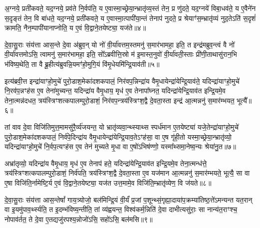 अ॒ग्नये॒ प्रती॑कवते॒ यद॒ग्नये॒ प्रव॑ते नि॒र्वप॑ति॒ य ए॒वास्मा॒च्छ्रेया॒न्भ्रातृ॑व्य॒स्तं तेन॒ प्र णु॑दते॒ यद॒ग्नये॑ विबा॒धव॑ते॒ य ए॒वैने॑न स॒दृङ्तं तेन॒ वि बा॑धते॒ यद॒ग्नये॒ प्रती॑कवते॒ य ए॒वास्मा॒त्पापी॑या॒न्तं तेनाप॑ नुदते॒ प्र श्रेयाꣳ॑स॒म्भ्रातृ॑व्यं नुद॒ते\-ऽति॑ स॒दृशं॑ क्रामति॒ नैन॒म्पापी॑यानाप्नोति॒ य ए॒वं वि॒द्वाने॒तयेष्ट्या॒ यज॑ते॥४॥

{\anuvakamend[{वृ॒णा॒म॒है॒ यत्पु॒रस्ता॒द्रक्षाꣳ॑सि वपेद॒ग्नये॑ विबा॒धव॑त ए॒वं च॒त्वारि॑ च॥१॥}]}

दे॒वा॒सु॒राः संय॑त्ता आस॒न्ते दे॒वा अ॑ब्रुव॒न् यो नो॑ वी॒र्या॑वत्तम॒स्तमनु॑ स॒मार॑भामहा॒ इति॒ त इन्द्र॑मब्रुव॒न्त्वं वै नो॑ वी॒र्या॑वत्तमो\-ऽसि॒ त्वामनु॑ स॒मार॑भामहा॒ इति॒ सो᳚\-ऽब्रवीत्ति॒स्रो म॑ इ॒मास्त॒नुवो॑ वी॒र्या॑वती॒स्ताः प्री॑णी॒ताथासु॑रान॒भि भ॑विष्य॒थेति॒ ता वै ब्रू॒हीत्य॑ब्रुवन्नि॒यमꣳ॑हो॒मुगि॒यं वि॑मृ॒धेयमि॑न्द्रि॒याव॑ती॥५॥

इत्य॑ब्रवी॒त्त इन्द्रा॑याꣳहो॒मुचे॑ पुरो॒डाश॒मेका॑दशकपालं॒ निर॑वप॒न्निन्द्रा॑य वैमृ॒धायेन्द्रा॑येन्द्रि॒याव॑ते॒ यदिन्द्रा॑याꣳहो॒मुचे॑ नि॒रव॑प॒न्नꣳह॑स ए॒व तेना॑मुच्यन्त॒ यदिन्द्रा॑य वैमृ॒धाय॒ मृध॑ ए॒व तेनापा᳚घ्नत॒ यदिन्द्रा॑येन्द्रि॒याव॑त इन्द्रि॒यमे॒व तेना॒त्मन्न॑दधत॒ त्रय॑स्त्रिꣳशत्कपालम्पुरो॒डाशं॒ निर॑वप॒न्त्रय॑स्त्रिꣳश॒द्वै दे॒वता॒स्ता इन्द्र॑ आ॒त्मन्ननु॑ स॒मार॑म्भयत॒ भूत्यै᳚॥६॥

तां वाव दे॒वा विजि॑तिमुत्त॒मामसु॑रै॒र्व्य॑जयन्त॒ यो भ्रातृ॑व्यवा॒न्थ्स्याथ्स स्पर्ध॑मान ए॒तयेष्ट्या॑ यजे॒तेन्द्रा॑याꣳहो॒मुचे॑ पुरो॒डाश॒मेका॑दशकपालं॒ निर्व॑पे॒दिन्द्रा॑य वैमृ॒धायेन्द्रा॑येन्द्रि॒याव॒ते\-ऽꣳह॑सा॒ वा ए॒ष गृ॑ही॒तो यस्मा॒च्छ्रेया॒न्भ्रातृ॑व्यो॒ यदिन्द्रा॑याꣳहो॒मुचे॑ नि॒र्वप॒त्यꣳह॑स ए॒व तेन॑ मुच्यते मृ॒धा वा ए॒षो॑\-ऽभिष॑ण्णो॒ यस्मा᳚थ्समा॒नेष्व॒न्यः श्रेया॑नु॒त॥७॥

अभ्रा॑तृव्यो॒ यदिन्द्रा॑य वैमृ॒धाय॒ मृध॑ ए॒व तेनाप॑ हते॒ यदिन्द्रा॑येन्द्रि॒याव॑त इन्द्रि॒यमे॒व तेना॒त्मन्ध॑त्ते॒ त्रय॑स्त्रिꣳशत्कपालम्पुरो॒डाशं॒ निर्व॑पति॒ त्रय॑स्त्रिꣳश॒द्वै दे॒वता॒स्ता ए॒व यज॑मान आ॒त्मन्ननु॑ स॒मार॑म्भयते॒ भूत्यै॒ सा वा ए॒षा विजि॑ति॒र्नामेष्टि॒र्य ए॒वं वि॒द्वाने॒तयेष्ट्या॒ यज॑त उत्त॒मामे॒व विजि॑ति॒म्भ्रातृ॑व्येण॒ वि ज॑यते॥८॥

{\anuvakamend[{इ॒न्द्रि॒याव॑ती॒ भूत्या॑ उ॒तैका॒न्नप॑ञ्चा॒शच्च॑॥२॥}]}

दे॒वा॒सु॒राः संय॑त्ता आस॒न्तेषां᳚ गाय॒त्र्योजो॒ बल॑मिन्द्रि॒यं वी॒र्यं॑ प्र॒जां प॒शून्थ्सं॒गृह्या॒दाया॑प॒क्रम्या॑तिष्ठ॒त्ते॑\-ऽमन्यन्त यत॒रान् वा इ॒यमु॑पाव॒र्थ्स्यति॒ त इ॒दम्भ॑विष्य॒न्तीति॒ तां व्य॑ह्वयन्त॒ विश्व॑कर्म॒न्निति॑ दे॒वा दाभीत्यसु॑राः॒ सा नान्य॑त॒राꣳश्च॒ नोपाव॑र्तत॒ ते दे॒वा ए॒तद्यजु॑रपश्य॒न्नोजो॑\-ऽसि॒ सहो॑\-ऽसि॒ बल॑मसि॥९॥

